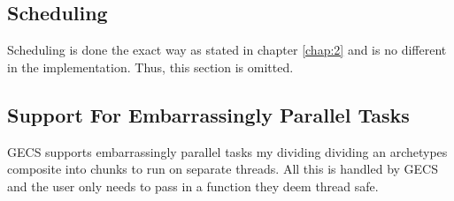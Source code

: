 \subsection{Scheduling}
Scheduling is done the exact way as stated in chapter \ref{chap:2} and is no different in the implementation. Thus, this section is omitted.

\subsection{Support For Embarrassingly Parallel Tasks}
GECS supports embarrassingly parallel tasks my dividing dividing an archetypes composite into chunks to run on separate threads. All this is handled by GECS and the user only needs to pass in a function they deem thread safe.